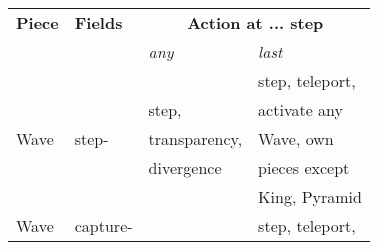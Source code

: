 





\clearpage %

\begin{table}[!h]
\centering
\begin{tabular}{ llll }
\toprule %
\textbf{Piece}              & \textbf{Fields}           & \multicolumn{2}{c}{ \textbf{Action at ... step} }         \\
                                                        \cmidrule{3-4} %
                            &                           & \emph{any}\footnotemark[1]    & \emph{last}               \\
\midrule %
\multirow{5}{*}{Wave\footnotemark[2]}
                            & \multirow{5}{*}{step-}    &                               & step, teleport,           \\
                            &                           & step,                         & activate any              \\
                            &                           & transparency,                 & Wave, own                 \\
                            &                           & divergence                    & pieces except             \\
                            &                           &                               & King, Pyramid             \\
\cmidrule{1-4} %
\multirow{5}{*}{Wave\footnotemark[3]}
                            & \multirow{5}{*}{capture-} &                               & step, teleport,           \\

\end{tabular}
\end{table}
